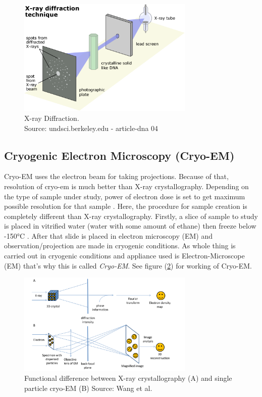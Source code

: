 \documentclass{report}
\begin{document}
\begin{figure}[H]
\includegraphics[width=0.75\textwidth]{xraydiffraction}
\centering
\captionsetup{justification=centering}
\caption{ X-ray Diffraction.\\ Source: undsci.berkeley.edu - article-dna 04}
\label{fig:xray-diffraction}
\end{figure}



\subsection{Cryogenic Electron Microscopy (Cryo-EM) }
Cryo-EM uses the electron beam for taking projections. Because of that, resolution of cryo-em is much better than X-ray crystallography. Depending on the type of sample under study, power of electron dose is set 
to get maximum possible resolution for that sample \cite{diebolder2012pushing}. Here, the procedure for sample creation is completely different than X-ray crystallography. Firstly, a slice of sample to study is placed in vitrified water (water with some amount of ethane) then freeze below \ang{-150}C \cite{diebolder2012pushing} \cite{wang2017cryo_crystal}. After that slide is placed in electron microscopy (EM) and observation/projection are made in cryogenic conditions. As whole thing is carried out in cryogenic conditions and appliance used is Electron-Microscope (EM) that's why this is called \textit{Cryo-EM}. See figure (\ref{fig:xray_crystal_cryoem}) for working of Cryo-EM.

\begin{figure}[H]
\includegraphics[width=0.75\textwidth]{xray_crystal_cryoem}
\centering
\captionsetup{justification=centering}
\caption{ Functional difference between X-ray crystallography (A) and single particle cryo-EM (B) Source: Wang et al. \cite{wang2017cryo_crystal}}
\label{fig:xray_crystal_cryoem}
\end{figure}
\end{document}
